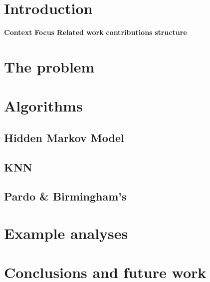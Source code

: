 
\section{Introduction}
\label{sec:introduction}

\textbf{Context}
\textbf{Focus}
\textbf{Related work}
\textbf{contributions}
\textbf{structure}

\section{The problem}
\label{sec:problem}

\section{Algorithms}
\label{sec:algorithms}

\subsection{Hidden Markov Model}
\label{sec:hidden-markov-model}

\subsection{KNN}
\label{sec:knn}

\subsection{Pardo \& Birmingham's}
\label{sec:pardo--birminghams}

\section{Example analyses}
\label{sec:example-analyses}

\section{Conclusions and future work}
\label{sec:concl-future-work}


